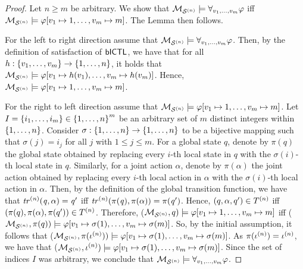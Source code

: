 \documentclass{article}
\begin{document}
\begin{proof}
Let  $n \geq m$ be arbitrary. We show that $\mathcal{M}_{\mathcal{S}^{(n)}}
\models \forall_{v_1,\ldots,v_m} \varphi$ iff $\mathcal{M}_{\mathcal{S}^{(n)}} \models \varphi[v_1 \mapsto 1, \ldots, v_m
\mapsto m]$. The Lemma then follows.

For the left to right direction assume that $\mathcal{M}_{\mathcal{S}^{(n)}} \models \forall_{v_1,\ldots,v_m} \varphi$. Then,
    by the definition of satisfaction of $\sf{bICTL}$, we have that for all $h:
    \left \{ v_1, \ldots, v_m \right \} \rightarrow \left \{ 1,\ldots,n \right \}$,  it holds that $\mathcal{M}_{\mathcal{S}^{(n)}} \models \varphi[v_1 \mapsto h(v_1), \ldots, v_m \mapsto h(v_m)]$.  Hence,
    $\mathcal{M}_{\mathcal{S}^{(n)}} \models \varphi[v_1 \mapsto 1, \ldots, v_m \mapsto m]$.

For the right to left direction assume that
    $\mathcal{M}_{\mathcal{S}^{(n)}} \models \varphi[v_1 \mapsto 1, \ldots, v_m \mapsto m]$. Let $I =
    \left \{ i_1, \ldots, i_m \right \} \in \left \{ 1, \ldots, n \right \}^m$ be an arbitrary set of $m$
    distinct integers within $\left \{ 1,\ldots,n \right \}$.  Consider $\sigma : \left \{ 1,
    \ldots, n \right \} \rightarrow \left \{ 1, \ldots, n \right \}$ to be a bijective mapping such
    that $\sigma(j) = i_j$ for all $j$ with $1 \leq j \leq m$. For a global
    state $q$, denote by $\pi(q)$ the global state obtained by replacing every
    $i$-th local state in $q$ with the $\sigma(i)$-th local state in $q$.
    Similarly, for a joint action $\alpha$, denote by $\pi(\alpha)$ the joint
    action obtained by replacing every $i$-th local action in $\alpha$ with the
    $\sigma(i)$-th local action in $\alpha$. Then, by the definition of the
    global transition function, we have that $\it{tr}^{(n)}(q, \alpha) = q'$  iff
    $\it{tr}^{(n)}(\pi(q), \pi(\alpha)) = \pi(q')$.  Hence,  $(q, \alpha, q') \in
    T^{(n)}$ iff $(\pi(q), \pi(\alpha), \pi(q')) \in T^{(n)}$.
    Therefore, ($\mathcal{M}_{\mathcal{S}^{(n)}}, q) \models  \varphi[v_1 \mapsto 1, \ldots, v_m
    \mapsto m]$ iff ($\mathcal{M}_{\mathcal{S}^{(n)}}, \pi(q)) \models  \varphi[v_1 \mapsto \sigma(1),
    \ldots, v_m \mapsto \sigma(m)]$. So, by the initial assumption,  it follows
    that ($\mathcal{M}_{\mathcal{S}^{(n)}}, \pi(\iota^{({n})})) \models  \varphi[v_1 \mapsto \sigma(1),
    \ldots, v_m \mapsto \sigma(m)]$. As $\pi(\iota^{({n})}) = \iota^{({n})}$, we
    have that ($\mathcal{M}_{\mathcal{S}^{(n)}}, \iota^{({n})}) \models  \varphi[v_1 \mapsto \sigma(1),
\ldots, v_m \mapsto \sigma(m)]$. Since the set of indices $I$ was arbitrary, we
conclude that $\mathcal{M}_{\mathcal{S}^{(n)}} \models \forall_{v_1,\ldots,v_m} \varphi$.  \end{proof}
\end{document}
